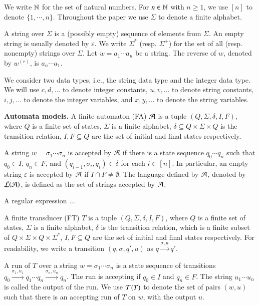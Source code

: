 We write $\mathbb{N}$ for the set of natural numbers. For $n \in \mathbb{N}$ with $n \ge 1$, we use $[n]$ to denote $\{1, \cdots, n\}$. Throughout the paper we use $\Sigma$ to denote a  finite alphabet. 

A string over $\Sigma$ is a (possibly empty) sequence of elements from $\Sigma$. An empty string is usually denoted by $\varepsilon$. We write $\Sigma^*$ (resp. $\Sigma^+$) for the set of all (resp. nonempty) strings over $\Sigma$. Let $w=a_1\cdots a_n$ be a string. The reverse of $w$, denoted by $w^{(r)}$, is $a_n \cdots a_1$. 

We consider two data types, i.e., the string data type and the integer data type. We will use $c, d,\dots$ to denote integer constants, $u, v, \dots$ to denote string constants,  $i, j, \dots$ to denote the  integer variables, and $x, y, \dots$ to denote the string variables.

\noindent\textbf{Automata models.} A finite automaton (FA) $\mathcal{A}$ is a tuple $(Q, \Sigma, \delta, I, F)$, where $Q$ is a finite set of states, $\Sigma$ is a finite alphabet, $\delta \subseteq Q \times \Sigma \times Q$ is the transition relation, $I,F \subseteq Q$ are the set of initial and final states respectively. 

A string $w=\sigma_1 \cdots \sigma_n$ is accepted by $\mathcal{A}$ if there is a state sequence $q_0 \cdots q_n$ such that $q_0 \in I$, $q_n \in F$, and $(q_{i-1}, \sigma_i, q_i) \in \delta$ for each $i \in [n]$. In particular, an empty string $\varepsilon$ is accepted by $\mathcal{A}$ if $I \cap F \neq \emptyset$. The language defined by $\mathcal{A}$, denoted by $\mathcal{L}(\mathcal{A})$, is defined as the set of strings accepted by $\mathcal{A}$.

A regular expression ... 

A finite transducer (FT) $T$ is a tuple $(Q, \Sigma, \delta, I, F)$, where $Q$ is a finite set of states, $\Sigma$ is a finite alphabet, $\delta$ is the transition relation, which is a finite subset of $Q \times \Sigma \times Q \times \Sigma^*$, $I,F \subseteq Q$ are the set of initial and final states respectively. For readability, we write a transition $(q, \sigma, q', u)$ as $q \xrightarrow{\sigma, u} q'$. 

A run of $T$ over a string $w=\sigma_1 \cdots \sigma_n$ is a state sequence of transitions $q_0 \xrightarrow{\sigma_1, u_1} q_1 \cdots q_n \xrightarrow{\sigma_n, u_n} q_n$. The run is accepting if $q_0 \in I$ and $q_n \in F$. The string $u_1 \cdots u_n$ is called the output of the run. We use $\mathcal{T}(T)$ to denote the set of pairs $(w, u)$ such that there is an accepting run of $T$ on $w$, with the output $u$.

